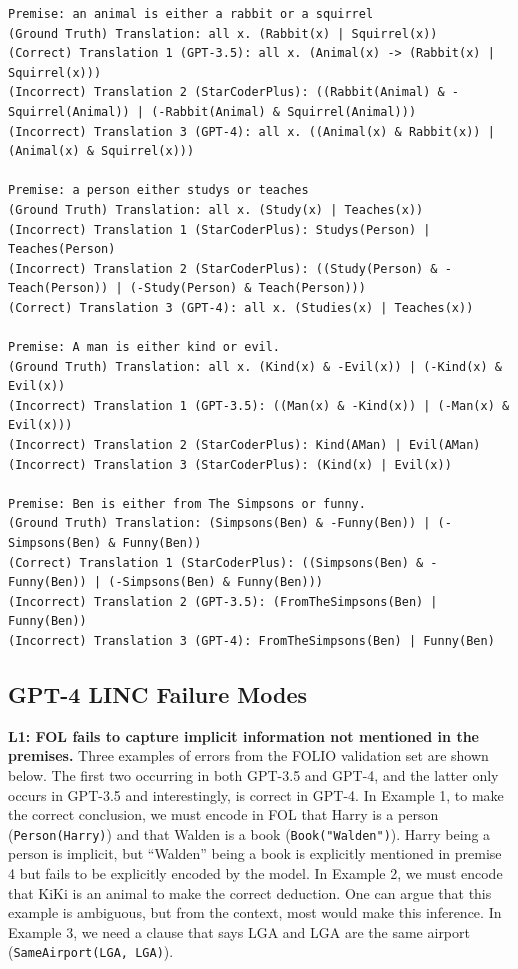 \begin{lstlisting}[breaklines=true]
Premise: an animal is either a rabbit or a squirrel
(Ground Truth) Translation: all x. (Rabbit(x) | Squirrel(x))
(Correct) Translation 1 (GPT-3.5): all x. (Animal(x) -> (Rabbit(x) | Squirrel(x)))
(Incorrect) Translation 2 (StarCoderPlus): ((Rabbit(Animal) & -Squirrel(Animal)) | (-Rabbit(Animal) & Squirrel(Animal)))
(Incorrect) Translation 3 (GPT-4): all x. ((Animal(x) & Rabbit(x)) | (Animal(x) & Squirrel(x)))

Premise: a person either studys or teaches
(Ground Truth) Translation: all x. (Study(x) | Teaches(x))
(Incorrect) Translation 1 (StarCoderPlus): Studys(Person) | Teaches(Person)
(Incorrect) Translation 2 (StarCoderPlus): ((Study(Person) & -Teach(Person)) | (-Study(Person) & Teach(Person)))
(Correct) Translation 3 (GPT-4): all x. (Studies(x) | Teaches(x))

Premise: A man is either kind or evil.
(Ground Truth) Translation: all x. (Kind(x) & -Evil(x)) | (-Kind(x) & Evil(x))
(Incorrect) Translation 1 (GPT-3.5): ((Man(x) & -Kind(x)) | (-Man(x) & Evil(x)))
(Incorrect) Translation 2 (StarCoderPlus): Kind(AMan) | Evil(AMan)
(Incorrect) Translation 3 (StarCoderPlus): (Kind(x) | Evil(x))

Premise: Ben is either from The Simpsons or funny.
(Ground Truth) Translation: (Simpsons(Ben) & -Funny(Ben)) | (-Simpsons(Ben) & Funny(Ben))
(Correct) Translation 1 (StarCoderPlus): ((Simpsons(Ben) & -Funny(Ben)) | (-Simpsons(Ben) & Funny(Ben)))
(Incorrect) Translation 2 (GPT-3.5): (FromTheSimpsons(Ben) | Funny(Ben))
(Incorrect) Translation 3 (GPT-4): FromTheSimpsons(Ben) | Funny(Ben)
\end{lstlisting}

\subsection{GPT-4 LINC Failure Modes}
\textbf{L1: FOL fails to capture implicit information not mentioned in the premises.}
Three examples of errors from the FOLIO validation set are shown below. The first two occurring in both GPT-3.5 and GPT-4, and the latter only occurs in GPT-3.5 and interestingly, is correct in GPT-4. In Example 1, to make the correct conclusion, we must encode in FOL that Harry is a person (\texttt{Person(Harry)}) and that Walden is a book (\texttt{Book("Walden")}). Harry being a person is implicit, but ``Walden'' being a book is explicitly mentioned in premise 4 but fails to be explicitly encoded by the model. In Example 2, we must encode that KiKi is an animal to make the correct deduction. One can argue that this example is ambiguous, but from the context, most would make this inference. In Example 3, we need a clause that says LGA and LGA are the same airport (\texttt{SameAirport(LGA, LGA)}).

